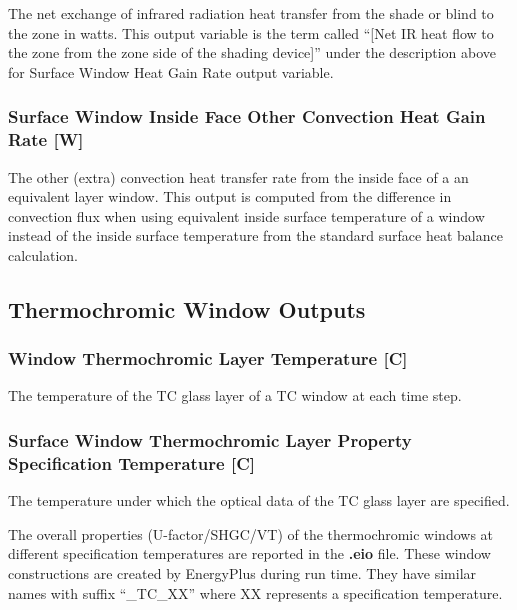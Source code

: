 The net exchange of infrared radiation heat transfer from the shade or blind to the zone in watts. This output variable is the term called ``{[}Net IR heat flow to the zone from the zone side of the shading device{]}'' under the description above for Surface Window Heat Gain Rate output variable.

\subsubsection{Surface Window Inside Face Other Convection Heat Gain Rate {[}W{]}}\label{surface-window-inside-face-other-convection-heat-gain-rate-w}

The other (extra) convection heat transfer rate from the inside face of a an equivalent layer window. This output is computed from the difference in convection flux when using equivalent inside surface temperature of a window instead of the inside surface temperature from the standard surface heat balance calculation.

\subsection{Thermochromic Window Outputs}\label{thermochomic-window-outputs}

\subsubsection{Window Thermochromic Layer Temperature {[}C{]}}\label{window-thermochromic-layer-temperature-c}

The temperature of the TC glass layer of a TC window at each time step.

\subsubsection{Surface Window Thermochromic Layer Property Specification Temperature {[}C{]}}\label{surface-window-thermochromic-layer-property-specification-temperature-c-000}

The temperature under which the optical data of the TC glass layer are specified.

The overall properties (U-factor/SHGC/VT) of the thermochromic windows at different specification temperatures are reported in the \textbf{.eio} file. These window constructions are created by EnergyPlus during run time. They have similar names with suffix ``\_TC\_XX'' where XX represents a specification temperature.

